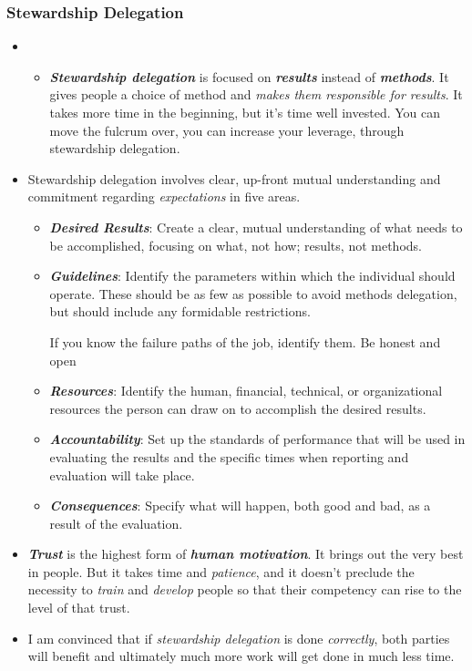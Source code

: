 \documentclass[11pt]{article}
\begin{document}
\subsubsection{Stewardship Delegation}
\begin{itemize}
\item \begin{itemize}
\item \emph{\textbf{Stewardship delegation}} is focused on \emph{\textbf{results}} instead of \emph{\textbf{methods}}. It gives people a choice of method and \emph{makes them responsible for results}. It takes more time in the beginning, but it's time well invested. You can move the fulcrum over, you can increase your leverage, through stewardship delegation.
\end{itemize}

\item Stewardship delegation involves clear, up-front mutual understanding and commitment regarding \emph{expectations} in five areas.
\begin{itemize}
\item \emph{\textbf{Desired Results}}: Create a clear, mutual understanding of what needs to be accomplished, focusing on what, not how; results, not methods.
\item \emph{\textbf{Guidelines}}: Identify the parameters within which the individual should operate. These should be as few as possible to avoid methods delegation, but should include any formidable restrictions. 

If you know the failure paths of the job, identify them. Be honest and open

\item \emph{\textbf{Resources}}: Identify the human, financial, technical, or organizational resources the person can draw on to accomplish the desired results.
\item \emph{\textbf{Accountability}}: Set up the standards of performance that will be used in evaluating the results and the specific times when reporting and evaluation will take place.
\item \emph{\textbf{Consequences}}: Specify what will happen, both good and bad, as a result of the evaluation.
\end{itemize}

\item \emph{\textbf{Trust}} is the highest form of \emph{\textbf{human motivation}}. It brings out the very best in people. But it takes time and \emph{patience}, and it doesn't preclude the necessity to \emph{train} and \emph{develop} people so that their competency can rise to the level of that trust.

\item I am convinced that if \emph{stewardship delegation} is done \emph{correctly}, both parties will benefit and ultimately much more work will get done in much less time.
\end{itemize}
\end{document}
